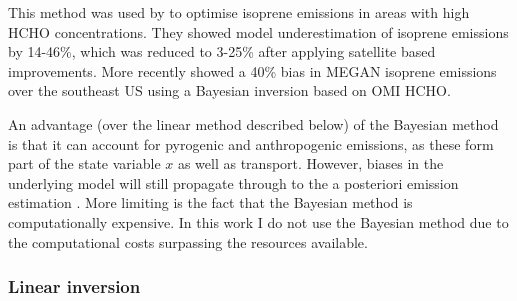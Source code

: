      This method was used by \textcite{Shim2005} to optimise isoprene emissions in areas with high HCHO concentrations. 
      They showed model underestimation of isoprene emissions by 14-46\%, which was reduced to 3-25\% after applying satellite based improvements.
      More recently \textcite{Kaiser2018} showed a 40\% bias in MEGAN isoprene emissions over the southeast US using a Bayesian inversion based on OMI HCHO.
      
      An advantage (over the linear method described below) of the Bayesian method is that it can account for pyrogenic and anthropogenic emissions, as these form part of the state variable $x$ as well as transport.
      However, biases in the underlying model will still propagate through to the a posteriori emission estimation \parencite{Curci2010}.
      More limiting is the fact that the Bayesian method is computationally expensive. %
      In this work I do not use the Bayesian method due to the computational costs surpassing the resources available.
      
    \subsubsection{Linear inversion}
      \label{BioIsop:intro:top_down_linear}
      
